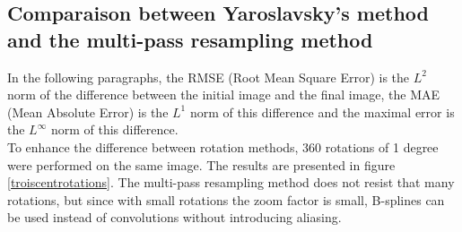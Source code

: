 
\subsection{Comparaison between Yaroslavsky's method and the multi-pass resampling method}


	In the following paragraphs, the RMSE (Root Mean Square Error) is the $L^2$ norm of the difference between the initial image and the final image, the MAE (Mean Absolute Error) is the $L^1$ norm of this difference and the maximal error is the $L^\infty$ norm of this difference.\\


	To enhance the difference between rotation methods, 360 rotations of 1 degree were performed on the same image. The results are presented in figure \ref{troiscentrotations}. The multi-pass resampling method does not resist that many rotations, but since with small rotations the zoom factor is small, B-splines can be used instead of convolutions without introducing aliasing.
	
\label{pleinsderotations}

